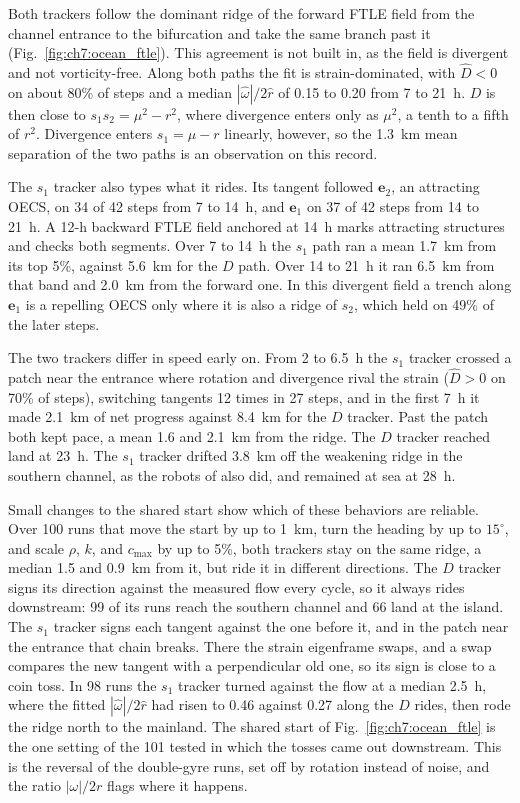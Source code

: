 Both trackers follow the dominant ridge of the forward FTLE field from the
channel entrance to the bifurcation and take the same branch past it
(Fig.~\ref{fig:ch7:ocean_ftle}). This agreement is not built
in, as the field is divergent and not vorticity-free. Along both paths
the fit is strain-dominated, with $\hat{D} < 0$ on about 80\% of
steps and a median $|\hat{\omega}|/2\hat{r}$ of 0.15 to 0.20 from 7 to 21~h.
$D$ is then close to $s_1 s_2 = \mu^2 - r^2$, where divergence enters only
as $\mu^2$, a tenth to a fifth of $r^2$. Divergence enters
$s_1 = \mu - r$ linearly, however, so the 1.3~km mean separation of the
two paths is an observation on this record.

The $s_1$ tracker also types what it rides. Its tangent followed
$\mathbf{e}_2$, an attracting OECS, on 34 of 42 steps from 7 to 14~h, and
$\mathbf{e}_1$ on 37 of 42 steps from 14 to 21~h. A 12-h backward FTLE
field anchored at 14~h marks attracting structures and checks both
segments. Over 7 to 14~h the $s_1$ path ran a mean 1.7~km from its
top 5\%, against 5.6~km for the $D$ path. Over 14 to 21~h it ran
6.5~km from that band and 2.0~km from the forward one. In this
divergent field a trench along $\mathbf{e}_1$ is a repelling OECS only
where it is also a ridge of $s_2$, which held on 49\% of the later steps.

The two trackers differ in speed early on. From 2 to 6.5~h the $s_1$
tracker crossed a patch near the entrance where rotation and divergence
rival the strain ($\hat{D} > 0$ on 70\% of steps), switching tangents 12
times in 27 steps, and in the first 7~h it made 2.1~km of net progress
against 8.4~km for the $D$ tracker. Past the patch both kept pace, a mean
1.6 and 2.1~km from the ridge. The $D$ tracker reached land at 23~h. The
$s_1$ tracker drifted 3.8~km off the weakening ridge in the southern
channel, as the robots of \cite{27} also did, and remained at sea at 28~h.

Small changes to the shared start show which of these behaviors are
reliable. Over 100 runs that move the start by up to 1~km, turn the
heading by up to $15^\circ$, and scale $\rho$, $k$, and $c_{\max}$ by up
to 5\%, both trackers stay on the same ridge, a median 1.5 and
0.9~km from it, but ride it in different directions. The $D$
tracker signs its direction against the measured flow every cycle, so it
always rides downstream: 99 of its runs reach the southern channel
and 66 land at the island. The $s_1$ tracker signs each tangent
against the one before it, and in the patch near the entrance that chain
breaks. There the strain eigenframe swaps, and a swap compares the new
tangent with a perpendicular old one, so its sign is close to a coin toss.
In 98 runs the $s_1$ tracker turned against the flow at a median
2.5~h, where the fitted $|\hat{\omega}|/2\hat{r}$ had risen to
0.46 against 0.27 along the $D$ rides, then rode the ridge
north to the mainland. The shared start of Fig.~\ref{fig:ch7:ocean_ftle} is
the one setting of the 101 tested in which the tosses came out
downstream. This is the reversal of the double-gyre runs, set off by
rotation instead of noise, and the ratio $|\omega|/2r$ flags where it
happens.

